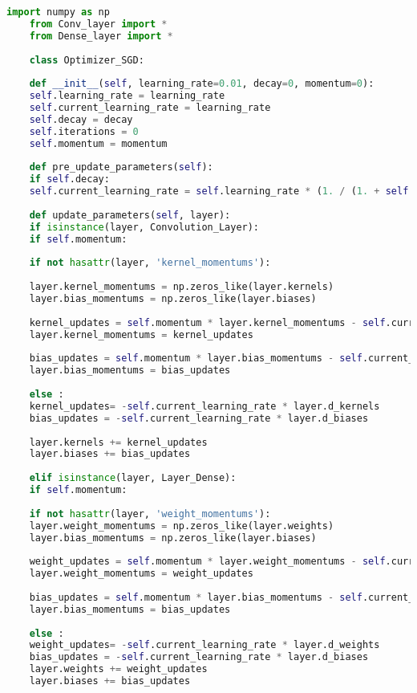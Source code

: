 \begin{lstlisting}[language=Python, caption=Optimizer function]
	import numpy as np 
	from Conv_layer import *
	from Dense_layer import *
	
	class Optimizer_SGD:
	
	def __init__(self, learning_rate=0.01, decay=0, momentum=0):
	self.learning_rate = learning_rate
	self.current_learning_rate = learning_rate
	self.decay = decay
	self.iterations = 0
	self.momentum = momentum
	
	def pre_update_parameters(self):
	if self.decay:
	self.current_learning_rate = self.learning_rate * (1. / (1. + self.decay * self.iterations))
	
	def update_parameters(self, layer):
	if isinstance(layer, Convolution_Layer):
	if self.momentum:
	
	if not hasattr(layer, 'kernel_momentums'):
	
	layer.kernel_momentums = np.zeros_like(layer.kernels)
	layer.bias_momentums = np.zeros_like(layer.biases)
	
	kernel_updates = self.momentum * layer.kernel_momentums - self.current_learning_rate * layer.d_kernels
	layer.kernel_momentums = kernel_updates
	
	bias_updates = self.momentum * layer.bias_momentums - self.current_learning_rate * layer.d_biases
	layer.bias_momentums = bias_updates
	
	else :
	kernel_updates= -self.current_learning_rate * layer.d_kernels
	bias_updates = -self.current_learning_rate * layer.d_biases
	
	layer.kernels += kernel_updates
	layer.biases += bias_updates
	
	elif isinstance(layer, Layer_Dense):
	if self.momentum:
	
	if not hasattr(layer, 'weight_momentums'):
	layer.weight_momentums = np.zeros_like(layer.weights)
	layer.bias_momentums = np.zeros_like(layer.biases)
	
	weight_updates = self.momentum * layer.weight_momentums - self.current_learning_rate * layer.d_weights
	layer.weight_momentums = weight_updates
	
	bias_updates = self.momentum * layer.bias_momentums - self.current_learning_rate * layer.d_biases
	layer.bias_momentums = bias_updates
	
	else :
	weight_updates= -self.current_learning_rate * layer.d_weights
	bias_updates = -self.current_learning_rate * layer.d_biases
	layer.weights += weight_updates
	layer.biases += bias_updates
	

\end{lstlisting}
